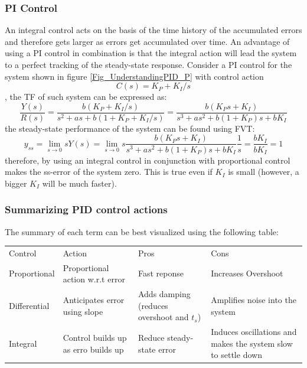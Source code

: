 \subsubsection{PI Control} \label{Sec_UnderstandingPID_PI}

An integral control acts on the basis of the time history of the accumulated errors and therefore gets larger as errors get accumulated over time. An advantage of using a PI control in combination is that the integral action will lead the system to a perfect tracking of the steady-state response. Consider a PI control for the system shown in figure \ref{Fig_UnderstandingPID_P} with control action $$C(s) = K_P + K_I / s$$, the TF of such system can be expressed as:
\begin{equation}
	\frac{Y(s)}{R(s)} = \frac{b\left(K_P + K_I / s \right)}{s^2 + as + b\left(1 + K_P + K_I / s\right)} = \frac{b(K_P s + K_I)}{s^3 + as^2 + b(1 + K_P)s + bK_I}
\end{equation}
the steady-state performance of the system can be found using FVT:
\begin{equation}
	y_{ss} = \lim_{s\to 0} s Y(s) = \lim_{s\to 0} s \frac{b(K_P s + K_I)}{s^3 + as^2 + b(1 + K_P)s + bK_I} \frac{1}{s} = \frac{b K_I}{b K_I} = 1
\end{equation}
therefore, by using an integral control in conjunction with proportional control makes the ss-error of the system zero. This is true even if $K_I$ is small (however, a bigger $K_I$ will be much faster).

\subsubsection{Summarizing PID control actions}

The summary of each term can be best visualized using the following table:
\begin{table}[h!]
	\centering
	\begin{tabular}{p{2.5cm} | p{4cm} | p{3cm} | p{3cm}}
		\toprule
		Control & Action & Pros & Cons \\
		\cmidrule{1-4}
		Proportional & Proportional action w.r.t error & Fast reponse & Increases Overshoot \\
		Differential & Anticipates error using slope & Adds damping (reduces overshoot and $t_s$) & Amplifies noise into the system \\
		Integral & Control builds up as erro builds up & Reduce steady-state error & Induces oscillations and makes the system slow to settle down \\
		\bottomrule
	\end{tabular}
\end{table}

